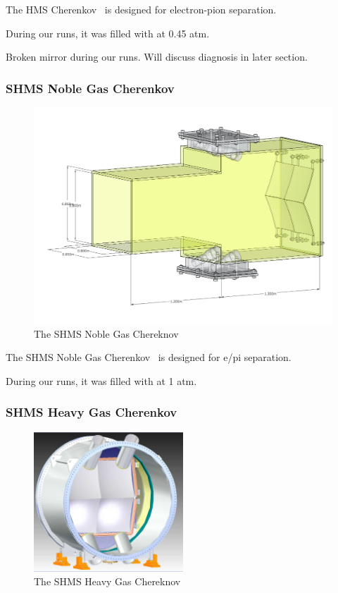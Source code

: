 The HMS Cherenkov~\cite{Cothran_1995} is designed for electron-pion separation.

During our runs, it was filled with  at 0.45 atm.

Broken mirror during our runs. Will discuss diagnosis in later section.

\subsubsection{SHMS Noble Gas Cherenkov}
\begin{figure}[!h]
    \centering
    \includegraphics[width=1.0\textwidth]{chap3/shms_ngc_render.png}
    \caption{The SHMS Noble Gas Chereknov }
    \label{fig:shms_ngcer}
\end{figure}

The SHMS Noble Gas Cherenkov~\cite{NGC_Design_Report} is designed for e/pi
separation.

During our runs, it was filled with  at 1 atm.

\subsubsection{SHMS Heavy Gas Cherenkov}
\begin{figure}[!h]
    \centering
    \includegraphics[width=0.5\textwidth]{chap3/shms_hgc_render.png}
    \caption{The SHMS Heavy Gas Chereknov }
    \label{fig:shms_hgcer}
\end{figure}

